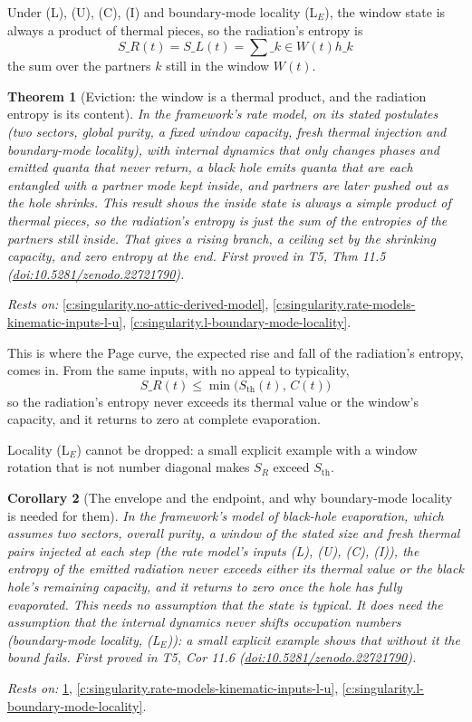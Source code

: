 \documentclass[11pt]{article}
\newtheorem{theorem}{Theorem}[section]
\newtheorem{corollary}[theorem]{Corollary}
\theoremstyle{definition}
\theoremstyle{plain}
\providecommand{\Sth}{}\renewcommand{\Sth}{S_{\mathrm{th}}}
\begin{document}
Under (L), (U), (C), (I) and boundary-mode locality (L$_E$), the window state is always a product of thermal pieces, so the radiation's entropy is \[ S\_R(t) = S\_L(t) = \sum\_{k \in W(t)} h\_k \] the sum over the partners $k$ still in the window $W(t)$.

\begin{theorem}[Eviction: the window is a thermal product, and the radiation entropy is its content]\label{c:singularity.eviction-window-thermal-product-radiation-entropy}
In the framework's rate model, on its stated postulates (two sectors, global purity, a fixed window capacity, fresh thermal injection and boundary-mode locality), with internal dynamics that only changes phases and emitted quanta that never return, a black hole emits quanta that are each entangled with a partner mode kept inside, and partners are later pushed out as the hole shrinks. This result shows the inside state is always a simple product of thermal pieces, so the radiation's entropy is just the sum of the entropies of the partners still inside. That gives a rising branch, a ceiling set by the shrinking capacity, and zero entropy at the end.
\emph{First proved in} T5, Thm 11.5 (\href{https://doi.org/10.5281/zenodo.22721790}{doi:10.5281/zenodo.22721790}).
\end{theorem}
\noindent\emph{Rests on:} \ref{c:singularity.no-attic-derived-model}, \ref{c:singularity.rate-models-kinematic-inputs-l-u}, \ref{c:singularity.l-boundary-mode-locality}.

This is where the Page curve, the expected rise and fall of the radiation's entropy, comes in. From the same inputs, with no appeal to typicality, \[ S\_R(t) \leq \min\bigl(\Sth(t),\, C(t)\bigr) \] so the radiation's entropy never exceeds its thermal value or the window's capacity, and it returns to zero at complete evaporation.

Locality (L$_E$) cannot be dropped: a small explicit example with a window rotation that is not number diagonal makes $S_R$ exceed $\Sth$.

\begin{corollary}[The envelope and the endpoint, and why boundary-mode locality is needed for them]\label{c:singularity.envelope-endpoint-why-boundary-mode-locality}
In the framework's model of black-hole evaporation, which assumes two sectors, overall purity, a window of the stated size and fresh thermal pairs injected at each step (the rate model's inputs (L), (U), (C), (I)), the entropy of the emitted radiation never exceeds either its thermal value or the black hole's remaining capacity, and it returns to zero once the hole has fully evaporated. This needs no assumption that the state is typical. It does need the assumption that the internal dynamics never shifts occupation numbers (boundary-mode locality, (L$_E$)): a small explicit example shows that without it the bound fails.
\emph{First proved in} T5, Cor 11.6 (\href{https://doi.org/10.5281/zenodo.22721790}{doi:10.5281/zenodo.22721790}).
\end{corollary}
\noindent\emph{Rests on:} \ref{c:singularity.eviction-window-thermal-product-radiation-entropy}, \ref{c:singularity.rate-models-kinematic-inputs-l-u}, \ref{c:singularity.l-boundary-mode-locality}.
\end{document}
